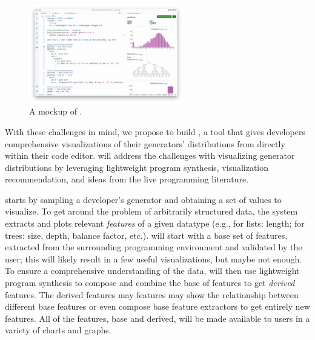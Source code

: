 \begin{figure}
  \centering
  \includegraphics[width=0.6\textwidth]{assets/gen-vis.png}
  \caption{A mockup of \genvis. }\label{fig:gen-vis}
\end{figure}

With these challenges in mind, we propose to build \genvis, a tool that
gives developers comprehensive visualizations of their generators' distributions
from directly within their code editor. \genvis{} will address the challenges
with visualizing generator distributions by leveraging lightweight program
synthesis, visualization recommendation, and ideas from the live programming
literature.

\genvis{} starts by sampling a developer's generator and obtaining a set of
values to visualize. To get around the problem of arbitrarily structured data,
the system extracts and plots relevant {\em features} of a given datatype (e.g.,
for lists: length; for trees: size, depth, balance factor, etc.). \genvis{} will
start with a base set of features, extracted from the surrounding programming
environment and validated by the user; this will likely result in a few useful
visualizations, but maybe not enough. To ensure a comprehensive understanding of
the data, \genvis{} will then use lightweight program synthesis to compose and
combine the base of features to get {\em derived} features. The derived features
may features may show the relationship between different base features or even
compose base feature extractors to get entirely new features.  All of the
features, base and derived, will be made available to users in a variety of
charts and graphs.

